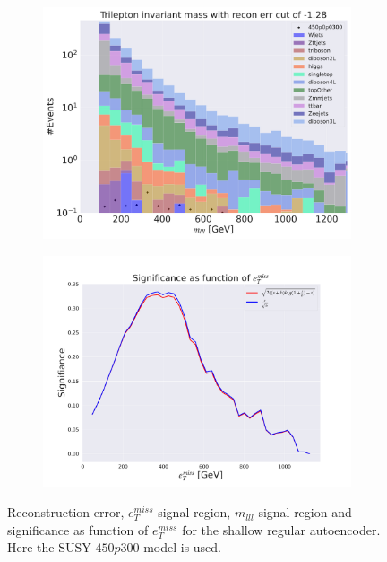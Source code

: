 \begin{figure}[H]
    \hfill
    \begin{subfigure}{.40\textwidth}
        \includegraphics[width=\textwidth]{Figures/AE_testing/small/3lep/b_data_recon_big_rm3_feats_sig_450p0p0300_mlll_recon_errcut_-1.28.pdf}
        \caption{}
        \label{fig:AE_3lep_small_mlll_450_2}
    \end{subfigure}
    \hfill   
    \begin{subfigure}{.40\textwidth}
        \includegraphics[width=\textwidth]{Figures/AE_testing/small/3lep/significance_etmiss_450p0p0300_-1.2800970222462997.pdf}
        \caption{}
        \label{fig:AE_3lep_small_signi_450_2}
    \end{subfigure}
    \hfill      
    \caption[3lep shallow network | $450p300$ | AE | 2]{Reconstruction error, $e_T^{miss}$ signal region, $m_{lll}$ signal region and significance as function of 
    $e_T^{miss}$ for the shallow regular autoencoder. Here the SUSY $450p300$ model is used.}
    \label{fig:AE_3lep_small_rec_sig_signi_450_2}
\end{figure}









